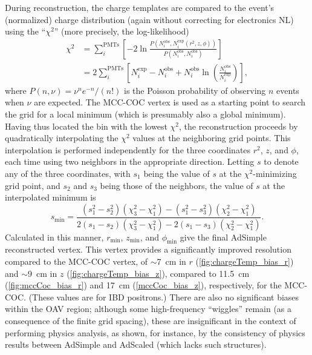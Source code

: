 \documentclass[../thesis.tex]{subfiles}
\begin{document}
\newcommand\Niobs{N_i^{\mathrm{obs}}}
\newcommand\Niexp{N_i^{\mathrm{exp}}}

During reconstruction, the charge templates are compared to the event's (normalized) charge distribution (again without correcting for electronics NL) using the ``$\chi^2$'' (more precisely, the log-likelihood)
\begin{align*}
  \chi^2 &= \sum_i^{\mathrm{PMTs}}\left[ -2 \ln \frac{P(\Niobs, \Niexp(r^2, z, \phi))}
        {P(\Niobs, \Niobs)} \right] \\
      &= 2 \sum_i^{\mathrm{PMTs}} \left[ \Niexp - \Niobs+ \Niobs \ln \left( \frac{\Niobs}{\Niexp} \right) \right],
\end{align*}
where $P(n, \nu) = \nu^n e^{-n} / (n!)$ is the Poisson probability of observing $n$ events when $\nu$ are expected. The MCC-COC vertex is used as a starting point to search the grid for a local minimum (which is presumably also a global minimum). Having thus located the bin with the lowest $\chi^2$, the reconstruction proceeds by quadratically interpolating the $\chi^2$ values at the neighboring grid points. This interpolation is performed independently for the three coordinates $r^2$, $z$, and $\phi$, each time using two neighbors in the appropriate direction. Letting $s$ to denote any of the three coordinates, with $s_1$ being the value of $s$ at the $\chi^2$-minimizing grid point, and $s_2$ and $s_3$ being those of the neighbors, the value of $s$ at the interpolated minimum is
\begin{equation}
  s_{\mathrm{min}} = \frac{(s_1^2 - s_2^2)(\chi_3^2 - \chi_1^2) - (s_1^2 - s_3^2)(\chi_2^2 - \chi_1^2)}{2(s_1 - s_2)(\chi_3^2 - \chi_1^2) - 2(s_1 - s_3)(\chi_2^2 - \chi_1^2)}.
\end{equation}
Calculated in this manner, $r_{\mathrm{min}}$, $z_{\mathrm{min}}$, and $\phi_{\mathrm{min}}$ give the final AdSimple reconstructed vertex. This vertex provides a significantly improved resolution compared to the MCC-COC vertex, of $\sim$7~cm in $r$ (\autoref{fig:chargeTemp_bias_r}) and $\sim$9~cm in $z$ (\autoref{fig:chargeTemp_bias_z}), compared to 11.5~cm (\autoref{fig:mccCoc_bias_r}) and 17~cm (\autoref{mccCoc_bias_z}), respectively, for the MCC-COC. (These values are for IBD positrons.) There are also no significant biases within the OAV region; although some high-frequency ``wiggles'' remain (as a consequence of the finite grid spacing), these are insignificant in the context of performing physics analysis, as shown, for instance, by the consistency of physics results between AdSimple and AdScaled (which lacks such structures).
\end{document}
